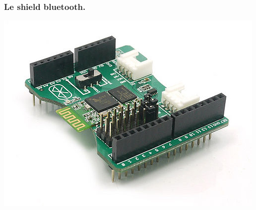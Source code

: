 \begin{frame}
    \frametitle{Le shield bluetooth.}
    \begin{center}
        \includegraphics[width=0.8\linewidth]{rcs/btshield.png}
    \end{center}
\end{frame}

